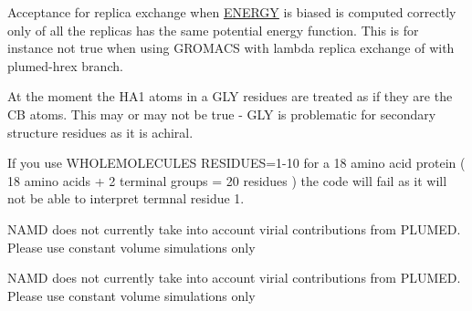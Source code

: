 
\begin{DoxyRefList}
\item[\label{bug__bug000001}%
\hypertarget{bug__bug000001}{}%
Page \hyperlink{_e_n_e_r_g_y}{E\+N\+E\+R\+G\+Y} ]Acceptance for replica exchange when \hyperlink{ENERGY}{E\+N\+E\+R\+G\+Y} is biased is computed correctly only of all the replicas has the same potential energy function. This is for instance not true when using G\+R\+O\+M\+A\+C\+S with lambda replica exchange of with plumed-\/hrex branch. 
\item[\label{bug__bug000002}%
\hypertarget{bug__bug000002}{}%
Page \hyperlink{_m_o_l_i_n_f_o}{M\+O\+L\+I\+N\+F\+O} ]At the moment the H\+A1 atoms in a G\+L\+Y residues are treated as if they are the C\+B atoms. This may or may not be true -\/ G\+L\+Y is problematic for secondary structure residues as it is achiral. 

If you use W\+H\+O\+L\+E\+M\+O\+L\+E\+C\+U\+L\+E\+S R\+E\+S\+I\+D\+U\+E\+S=1-\/10 for a 18 amino acid protein ( 18 amino acids + 2 terminal groups = 20 residues ) the code will fail as it will not be able to interpret termnal residue 1. 
\item[\label{bug__bug000004}%
\hypertarget{bug__bug000004}{}%
Page \hyperlink{namd-2-8}{namd-\/2.8} ]N\+A\+M\+D does not currently take into account virial contributions from P\+L\+U\+M\+E\+D. Please use constant volume simulations only 
\item[\label{bug__bug000005}%
\hypertarget{bug__bug000005}{}%
Page \hyperlink{namd-2-9}{namd-\/2.9} ]N\+A\+M\+D does not currently take into account virial contributions from P\+L\+U\+M\+E\+D. Please use constant volume simulations only
\end{DoxyRefList}